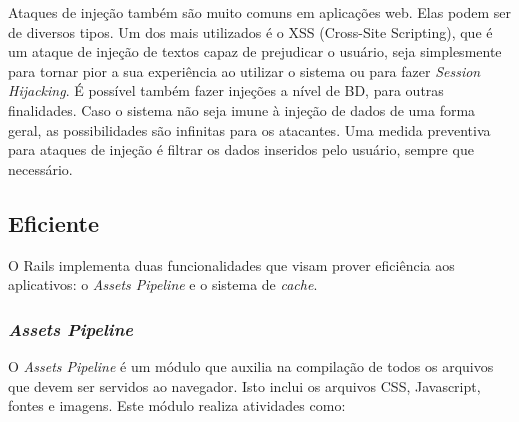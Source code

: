 Ataques de injeção também são muito comuns em aplicações web. Elas podem ser de diversos tipos. Um dos mais utilizados é o XSS (Cross-Site Scripting),
que é um ataque de injeção de textos capaz de prejudicar o usuário, seja simplesmente para tornar pior a sua experiência ao utilizar o sistema ou para fazer \textit{Session Hijacking}. É possível também fazer injeções a nível de BD, para outras finalidades. Caso o sistema não seja imune à injeção de dados de uma forma geral, as possibilidades são infinitas para os atacantes. Uma medida preventiva para ataques de injeção é filtrar os dados inseridos pelo usuário, sempre que necessário.

\subsection{Eficiente}

O Rails implementa duas funcionalidades que visam prover eficiência aos aplicativos: o \textit{Assets Pipeline} e o sistema de \textit{cache}.

\subsubsection{\textit{Assets Pipeline}}

O \textit{Assets Pipeline} é um módulo que auxilia na compilação de todos os arquivos que devem ser servidos ao navegador. Isto inclui os arquivos CSS, Javascript, fontes e imagens. Este módulo realiza atividades como:


